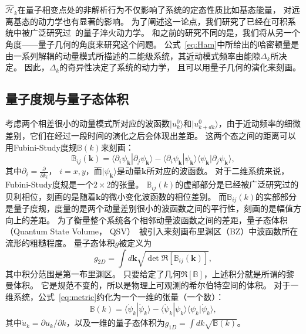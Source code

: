 			$\hat{\mathcal{H}}_k$在量子相变点处的非解析行为不仅影响了系统的定态性质比如基态能量， 对远离基态的动力学也有显著的影响。
			为了阐述这一论点，我们研究了已经在可积系统中被广泛研究过~\cite{Barthel2008,Calabrese2011,Mitra2018}的量子淬火动力学。
			和之前的研究不同的是，我们将从另一个角度——量子几何的角度来研究这个问题。
			公式~\eqref{eq:Ham}中所给出的哈密顿量是由一系列解耦的动量模式所描述的二能级系统，其近动模式频率由能隙$\Delta_k$所决定。
			因此，$\Delta_k$的奇异性决定了系统的动力学， 且可以用量子几何的演化来刻画。
		
		\subsection{量子度规与量子态体积}
		
			考虑两个相差很小的动量模式所对应的波函数$|u^0_k\rangle$和$|u^0_{k+dk}\rangle$，由于近动频率的细微差别，它们在经过一段时间的演化之后会体现出差距。
			这两个态之间的距离可以用Fubini-Study度规$\mathbb{B}(k)$来刻画：
			\begin{equation}
				\mathbb{B}_{ij}(\mathbf{k})=\langle\partial_i \psi_\mathbf{k} |\partial_j \psi_\mathbf{k}\rangle-\langle\partial_i \psi_\mathbf{k} |\psi_\mathbf{k}\rangle \langle \psi_\mathbf{k}|\partial_j \psi_\mathbf{k}\rangle, \label{eq:metric}
			\end{equation}
			其中$\partial_i=\frac{\partial}{\partial k_i}$， $i=x,y$，而$|\psi_\mathbf{k}\rangle$是动量$\mathbf{k}$所对应的波函数。
			对于二维系统来说，Fubini-Study度规是一个$2\times2$的张量。
			$\mathbb{B}_{ij}(k)$的虚部部分是已经被广泛研究过的贝利相位，刻画的是随着$\mathbf{k}$的微小变化波函数的相位差别。
			而$\mathbb{B}_{ij}(k)$的实部部分是量子度规，度量的是两个动量差别很小的波函数之间的平行性，刻画的是幅值方向上的差距。
			为了衡量整个系统各个相邻动量波函数之间的差距，量子态体积（Quantum State Volume， QSV）~\cite{Ozawa20210}被引入来刻画布里渊区（BZ）中波函数所在流形的粗糙程度。
			量子态体积$g$被定义为
			\begin{equation} \label{eq:g_2D}
				g_{2D}=\int d\mathbf{k} \sqrt{\det\Re[\mathbb{B}_{ij}(\mathbf{k})]},
			\end{equation}
			其中积分范围是第一布里渊区。
			只要给定了几何$\Re[\mathbb{B}]$，上述积分就是所谓的黎曼体积。
			它是规范不变的，所以是物理上可观测的希尔伯特空间的体积。
			对于一维系统，公式~\eqref{eq:metric}约化为一个一维的张量（一个数）：
			\begin{equation}\label{eq:B_1D}
				\mathbb{B}(k)= \langle \dot{\psi}_k|\dot{\psi}_k\rangle-\langle \dot{\psi}_k|\psi_k\rangle \langle \psi_k|\dot{\psi}_k \rangle,
			\end{equation}
			其中$\dot{u}_k=\partial u_k/\partial k$，以及一维的量子态体积为$g_{1D}=\int dk \sqrt{\mathbb{B}(k)}$。

